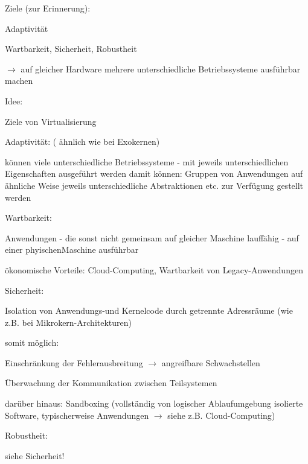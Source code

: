 \documentclass[a4paper]{article}
\begin{document}
\begin{multicols}{3}
    \begin{itemize*}
        \item Ziele (zur Erinnerung):
        \begin{itemize*}
            \item Adaptivität
            \item Wartbarkeit, Sicherheit, Robustheit
            \item[$\rightarrow$] auf gleicher Hardware mehrere unterschiedliche Betriebssysteme ausführbar machen
        \end{itemize*}
        \item Idee:
    \end{itemize*}

    Ziele von Virtualisierung

    \begin{itemize*}
        \item Adaptivität: ( ähnlich wie bei Exokernen)
        \begin{itemize*}
            \item können viele unterschiedliche Betriebssysteme - mit jeweils unterschiedlichen Eigenschaften ausgeführt werden damit können: Gruppen von Anwendungen auf ähnliche Weise jeweils unterschiedliche Abstraktionen etc. zur Verfügung gestellt werden
        \end{itemize*}
        \item Wartbarkeit:
        \begin{itemize*}
            \item Anwendungen - die sonst nicht gemeinsam auf gleicher Maschine lauffähig - auf einer phyischenMaschine ausführbar
            \item ökonomische Vorteile: Cloud-Computing, Wartbarkeit von Legacy-Anwendungen
        \end{itemize*}
        \item Sicherheit:
        \begin{itemize*}
            \item Isolation von Anwendungs-und Kernelcode durch getrennte Adressräume (wie z.B. bei Mikrokern-Architekturen)
            \item somit möglich: \begin{enumerate*} \item Einschränkung der Fehlerausbreitung $\rightarrow$ angreifbare Schwachstellen \item Überwachung der Kommunikation zwischen Teilsystemen \end{enumerate*}
            \item darüber hinaus: Sandboxing (vollständig von logischer Ablaufumgebung isolierte Software, typischerweise Anwendungen $\rightarrow$ siehe z.B. Cloud-Computing)
        \end{itemize*}
        \item Robustheit:
        \begin{itemize*}
            \item siehe Sicherheit!
        \end{itemize*}
    \end{itemize*}


\end{multicols}
\end{document}
